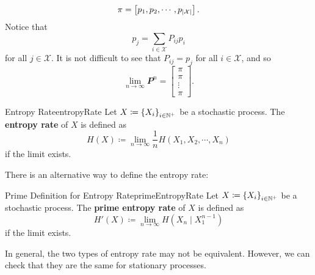 \documentclass[math, code]{amznotes}
\theoremstyle{remark}
\begin{document}
\begin{equation*}
    \pi = \begin{bmatrix}
        p_1, p_2, \cdots, p_{{\left\lvert {\mathcal{X}} \right\rvert}}
    \end{bmatrix}.
\end{equation*}
Notice that
\begin{equation*}
    p_j = \sum_{i \in \mathcal{X}}P_{ij}p_i
\end{equation*}
for all $j \in \mathcal{X}$. It is not difficult to see that $P_{ij} = p_j$ for all $i \in \mathcal{X}$, and so 
\begin{equation*}
    \lim_{n \to \infty}\mathbfit{P}^n = \begin{bmatrix}
        \pi \\
        \pi \\
        \vdots \\
        \pi
    \end{bmatrix}.
\end{equation*}
\begin{dfnbox}{Entropy Rate}{entropyRate}
    Let $X \coloneqq \left\{X_i\right\}_{i \in \mathbb{N}^+}$ be a stochastic process. The {\color{red} \textbf{entropy rate}} of $X$ is defined as 
    \begin{equation*}
        H\left(X\right) \coloneqq \lim_{n \to \infty}\frac{1}{n}H\left(X_1, X_2, \cdots, X_n\right)
    \end{equation*}
    if the limit exists.
\end{dfnbox}
There is an alternative way to define the entropy rate:
\begin{dfnbox}{Prime Definition for Entropy Rate}{primeEntropyRate}
    Let $X \coloneqq \left\{X_i\right\}_{i \in \mathbb{N}^+}$ be a stochastic process. The {\color{red} \textbf{prime entropy rate}} of $X$ is defined as 
    \begin{equation*}
        H'\left(X\right) \coloneqq \lim_{n \to \infty}H\left(X_{n} \mid X_1^{n - 1}\right)
    \end{equation*}
    if the limit exists.
\end{dfnbox}
In general, the two types of entropy rate may not be equivalent. However, we can check that they are the same for stationary processes.
\end{document}
